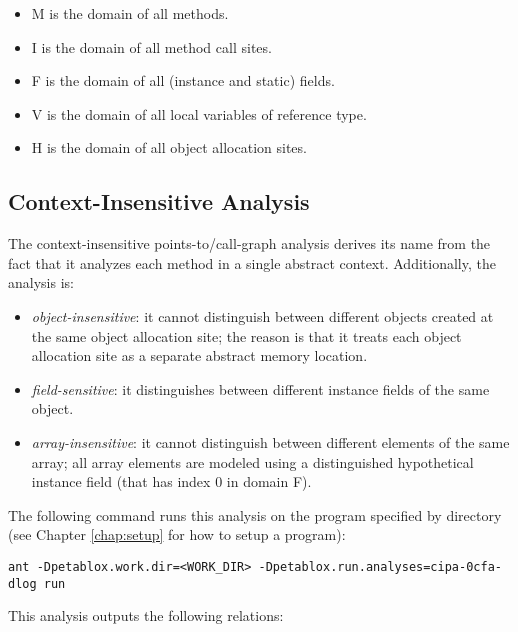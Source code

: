 \texonly{\newpage}

\begin{itemize}
\item M is the domain of all methods.
\item I is the domain of all method call sites.
\item F is the domain of all (instance and static) fields.
\item V is the domain of all local variables of reference type.
\item H is the domain of all object allocation sites.
\end{itemize}

\subsection{Context-Insensitive Analysis}

The context-insensitive points-to/call-graph analysis derives its name from the
fact that it analyzes each method in a single abstract context.
Additionally, the analysis is:
\begin{itemize}
\item
{\it object-insensitive}: it cannot distinguish between
different objects created at the same object allocation site; the reason is that
it treats each object allocation site as a separate abstract memory location.
\item
{\it field-sensitive}: it distinguishes between
different instance fields of the same object.
\item
{\it array-insensitive}: it cannot distinguish between
different elements of the same array; all array elements are modeled using a
distinguished hypothetical instance field (that has index 0 in domain F).
\end{itemize}

The following command runs this analysis on the program specified
by directory  (see Chapter \ref{chap:setup} for how to setup a
program):

\begin{framed}
\begin{verbatim}
ant -Dpetablox.work.dir=<WORK_DIR> -Dpetablox.run.analyses=cipa-0cfa-dlog run
\end{verbatim}
\end{framed}

This analysis outputs the following relations:

